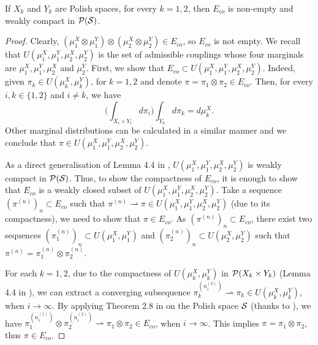   \begin{lemma} \label{compact_subset}
    If $X_k$ and $Y_k$ are Polish spaces, for every $k = 1, 2$,
    then $E_{co}$ is non-empty and weakly compact in $\mathcal P(\mathcal S)$.
  \end{lemma}
  \begin{proof}
    Clearly, $(\mu_1^X \otimes \mu_1^Y) \otimes (\mu_2^X \otimes \mu_2^Y) \in E_{co}$,
    so $E_{co}$ is not empty.
    We recall that $U(\mu_1^X, \mu_1^Y, \mu_2^X, \mu_2^Y)$ is the set of admissible couplings
    whose four marginals are $\mu^X_1, \mu^Y_1, \mu^X_2$ and $\mu^Y_2$. First,
    we show that $E_{co} \subset U(\mu_1^X, \mu_1^Y, \mu_2^X, \mu_2^Y)$.
    Indeed, given $\pi_k \in U(\mu_k^X, \mu_k^Y)$, for $k = 1,2$ and denote
    $\pi = \pi_1 \otimes \pi_2 \in E_{co}$. Then, for every $i, k \in \{ 1, 2 \}$ and $i \neq k$,
    we have
    \begin{equation}
        \bigg(\int_{X_{i} \times Y_{i}} d\pi_i \bigg) \int_{Y_k}  d\pi_k = d\mu_k^X.
    \end{equation}
    Other marginal distributions can be calculated in a similar manner and we conclude that
    $\pi \in U(\mu_1^X, \mu_1^Y, \mu_2^X, \mu_2^Y)$.

    As a direct generalisation of Lemma 4.4 in \citep{Villani08},
    $U(\mu_1^X, \mu_1^Y, \mu_2^X, \mu_2^Y)$ is weakly compact in $\mathcal P(\mathcal S)$. Thus,
    to show the compactness of $E_{co}$, it is enough to show that $E_{co}$
    is a weakly closed subset of $U(\mu_1^X, \mu_1^Y, \mu_2^X, \mu_2^Y)$.
    Take a sequence $(\pi^{(n)})_n \subset E_{co}$
    such that $\pi^{(n)} \rightharpoonup \pi \in U(\mu_1^X, \mu_1^Y, \mu_2^X, \mu_2^Y)$
    (due to its compactness), we need to show that $\pi \in E_{co}$.
    As $(\pi^{(n)})_n \subset E_{co}$, there exist two sequences
    $(\pi_1^{(n)})_n \subset U(\mu_1^X, \mu_1^Y)$ and $(\pi_2^{(n)})_n \subset U(\mu_2^X, \mu_2^Y)$
    such that $\pi^{(n)} = \pi_1^{(n)} \otimes \pi_2^{(n)}$.

    For each $k = 1, 2$, due to the compactness of $U(\mu_k^X, \mu_k^Y)$ in $\mathcal P(X_k \times Y_k)$
    (Lemma 4.4 in \citep{Villani08}), we can extract a converging subsequence
    $\pi^{(n_i^{(k)})}_k \rightharpoonup \pi_k \in U(\mu_k^X, \mu_k^Y)$, when $i \to \infty$.
    By applying Theorem 2.8 in \citep{Billingsley99} on the Polish space $\mathcal S$
    (thanks to ), we have
    $\pi^{(n_i^{(1)})}_1 \otimes \pi^{(n_i^{(2)})}_2 \rightharpoonup \pi_1 \otimes \pi_2 \in E_{co}$,
    when $i \to \infty$. This implies $\pi = \pi_1 \otimes \pi_2$, thus $\pi \in E_{co}$.
  \end{proof}
